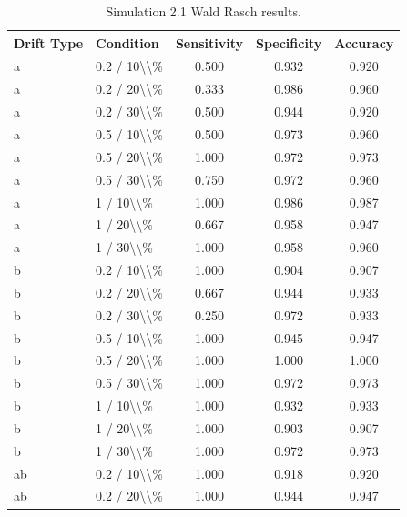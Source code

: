 \begin{table}[!h]
\centering
\caption{\label{tab:tab:sim21_rasch}Simulation 2.1 Wald Rasch results.}
\centering
\begin{tabular}[t]{llccc}
\toprule
Drift Type & Condition & Sensitivity & Specificity & Accuracy\\
\midrule
a & 0.2 / 10\textbackslash{}\textbackslash{}\% & 0.500 & 0.932 & 0.920\\
a & 0.2 / 20\textbackslash{}\textbackslash{}\% & 0.333 & 0.986 & 0.960\\
a & 0.2 / 30\textbackslash{}\textbackslash{}\% & 0.500 & 0.944 & 0.920\\
a & 0.5 / 10\textbackslash{}\textbackslash{}\% & 0.500 & 0.973 & 0.960\\
a & 0.5 / 20\textbackslash{}\textbackslash{}\% & 1.000 & 0.972 & 0.973\\
\addlinespace
a & 0.5 / 30\textbackslash{}\textbackslash{}\% & 0.750 & 0.972 & 0.960\\
a & 1 / 10\textbackslash{}\textbackslash{}\% & 1.000 & 0.986 & 0.987\\
a & 1 / 20\textbackslash{}\textbackslash{}\% & 0.667 & 0.958 & 0.947\\
a & 1 / 30\textbackslash{}\textbackslash{}\% & 1.000 & 0.958 & 0.960\\
b & 0.2 / 10\textbackslash{}\textbackslash{}\% & 1.000 & 0.904 & 0.907\\
\addlinespace
b & 0.2 / 20\textbackslash{}\textbackslash{}\% & 0.667 & 0.944 & 0.933\\
b & 0.2 / 30\textbackslash{}\textbackslash{}\% & 0.250 & 0.972 & 0.933\\
b & 0.5 / 10\textbackslash{}\textbackslash{}\% & 1.000 & 0.945 & 0.947\\
b & 0.5 / 20\textbackslash{}\textbackslash{}\% & 1.000 & 1.000 & 1.000\\
b & 0.5 / 30\textbackslash{}\textbackslash{}\% & 1.000 & 0.972 & 0.973\\
\addlinespace
b & 1 / 10\textbackslash{}\textbackslash{}\% & 1.000 & 0.932 & 0.933\\
b & 1 / 20\textbackslash{}\textbackslash{}\% & 1.000 & 0.903 & 0.907\\
b & 1 / 30\textbackslash{}\textbackslash{}\% & 1.000 & 0.972 & 0.973\\
ab & 0.2 / 10\textbackslash{}\textbackslash{}\% & 1.000 & 0.918 & 0.920\\
ab & 0.2 / 20\textbackslash{}\textbackslash{}\% & 1.000 & 0.944 & 0.947\\

\end{tabular}
\end{table}
